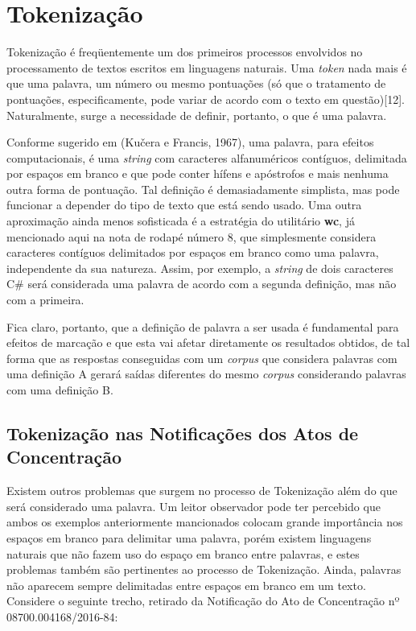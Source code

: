 \documentclass[11pt]{report}
\begin{document}
\section{Tokenização}

\indent\indent Tokenização é freqüentemente um dos primeiros processos envolvidos no processamento de textos escritos em linguagens naturais. Uma \textit{token} nada mais é que uma
palavra, um número ou mesmo pontuações (só que o tratamento de pontuações, especificamente, pode variar de acordo com o texto em questão)[12]. Naturalmente, surge a necessidade de
definir, portanto, o que é uma palavra.

Conforme sugerido em (Kučera e Francis, 1967), uma palavra, para efeitos computacionais, é uma \textit{string} com caracteres alfanuméricos
contíguos, delimitada por espaços em branco e que pode conter hífens e apóstrofos e mais nenhuma outra forma de pontuação. Tal definição é demasiadamente simplista,
mas pode funcionar a depender do tipo de texto que está sendo usado. Uma outra aproximação ainda menos sofisticada é a estratégia do utilitário \textbf{wc}, já mencionado
aqui na nota de rodapé número 8, que simplesmente considera caracteres contíguos delimitados por espaços em branco como uma palavra, independente da sua natureza. Assim, por exemplo,
a \textit{string} de dois caracteres C\# será considerada uma palavra de acordo com a segunda definição, mas não com a primeira.

Fica claro, portanto, que a definição de palavra a ser usada é fundamental para efeitos de marcação e que esta vai afetar diretamente os resultados obtidos, de tal forma que as
respostas conseguidas com um \textit{corpus} que considera palavras com uma definição A gerará saídas diferentes do mesmo \textit{corpus} considerando palavras com uma definição B.

\subsection{Tokenização nas Notificações dos Atos de Concentração}

\indent\indent Existem outros problemas que surgem no processo de Tokenização além do que será considerado uma palavra. Um leitor observador pode ter percebido que ambos os exemplos anteriormente
mancionados colocam grande importância nos espaços em branco para delimitar uma palavra, porém existem linguagens naturais que não fazem uso do espaço em branco entre palavras, e
estes problemas também são pertinentes ao processo de Tokenização. Ainda, palavras não aparecem sempre delimitadas entre espaços em branco em um texto. Considere o seguinte trecho,
retirado da Notificação do Ato de Concentração nº 08700.004168/2016-84:
\end{document}
